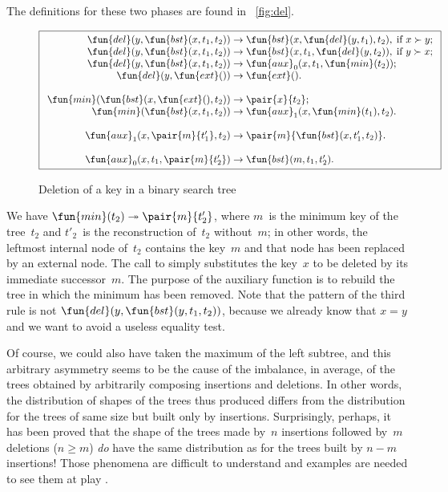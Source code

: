 The definitions for these two phases are found in \fig~\vref{fig:del}.
\begin{figure}
\begin{equation*}
\boxed{
\begin{array}{r@{\;}l@{\;}l}
  \fun{del}(y,\fun{bst}(x,t_1,t_2)) & \rightarrow &
  \fun{bst}(x,\fun{del}(y,t_1),t_2),\; \text{if \(x \succ y\)};\\
\fun{del}(y,\fun{bst}(x,t_1,t_2)) & \rightarrow &
  \fun{bst}(x,t_1,\fun{del}(y,t_2)),\; \text{if \(y \succ x\)};\\
\fun{del}(y,\fun{bst}(x,t_1,t_2)) & \rightarrow &
   \fun{aux}_0(x,t_1,\fun{min}(t_2));\\
\fun{del}(y,\fun{ext}()) & \rightarrow & \fun{ext}().\\
\\
\fun{min}(\fun{bst}(x,\fun{ext}(),t_2)) & \rightarrow & \pair{x}{t_2};\\
\fun{min}(\fun{bst}(x,t_1,t_2)) & \rightarrow &
  \fun{aux}_1(x,\fun{min}(t_1),t_2).\\
\\
\fun{aux}_1(x,\pair{m}{t'_1},t_2) & \rightarrow &
  \pair{m}{\fun{bst}(x,t'_1,t_2)}.\\
\\
\fun{aux}_0(x,t_1,\pair{m}{t'_2}) & \rightarrow & \fun{bst}(m,t_1,t'_2).
\end{array}}
\end{equation*}
\caption{Deletion of a key in a binary search tree}
\label{fig:del}
\end{figure}
We have \(\fun{min}(t_2) \twoheadrightarrow
\pair{m}{t'_2}\), where \(m\)~is the minimum
key of the tree~\(t_2\) and \(t'_2\)~is the reconstruction of~\(t_2\)
without~\(m\); in other words, the leftmost internal node of~\(t_2\)
contains the key~\(m\) and that node has been replaced by an external
node. The call to  simply substitutes the key~\(x\)
to be deleted by its immediate successor~\(m\). The purpose of the
auxiliary function  is to rebuild the tree in which
the minimum has been removed. Note that the pattern of the third rule
is not \(\fun{del}(y, \fun{bst}(y,t_1,t_2))\),
because we already know that \(x=y\) and we want to avoid a useless
equality test.

Of course, we could also have taken the maximum of the left subtree,
and this arbitrary asymmetry seems to be the cause of the imbalance,
in average, of the trees obtained by arbitrarily composing insertions
and deletions. In other words, the distribution of shapes of the trees
thus produced differs from the distribution for the trees of same size
but built only by insertions. Surprisingly, perhaps, it has been
proved that the shape of the trees made by~\(n\) insertions followed
by~\(m\) deletions (\(n \geq m\)) \emph{do} have the same distribution
as for the trees built by \(n-m\) insertions! Those phenomena are
difficult to understand and examples are needed to see them at play
\citep{Panny_2010,Eppinger_1983,CulbersonMunro_1989,CulbersonEvans_1994,Knuth_1998a,Heyer_2009}.

